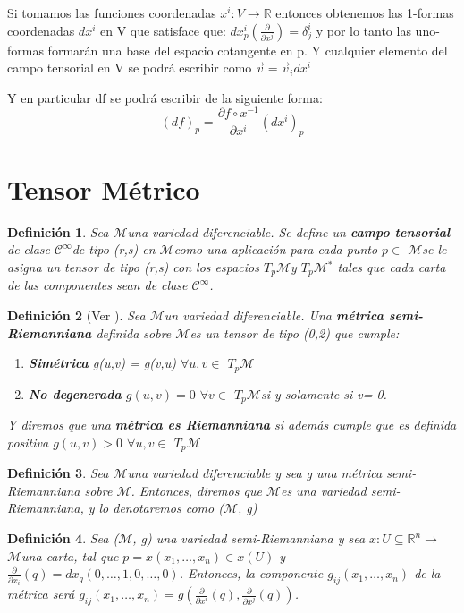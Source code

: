 \documentclass[pdftex,11pt,a4paper]{book}
\newtheorem{defi}{Definici\'on}
\newcommand{\M}{$\mathscr{M}$}
\newcommand{\Cinf}{ $\mathscr{C}^\infty$}
\newcommand{\tpm}{$T_p\mathscr{M}$}
\newcommand{\x}{(x_1, \ldots,x_n)}
\begin{document}
Si tomamos las funciones coordenadas $x^i:V \to \mathbb{R}$ entonces obtenemos las 1-formas coordenadas $dx^i$ en V que satisface que: 
$dx^i_p(\frac{\partial}{\partial x^j}) = \delta^i_j$ y por lo tanto 
las uno-formas formarán una base del espacio cotangente en p. Y cualquier elemento del campo tensorial en V se podrá escribir como $\vec{v}= \vec{v}_i dx^i $

Y en particular df se podrá escribir de la siguiente forma: 
\begin{equation*}
    (df)_p= \frac{\partial f\circ x^{-1}}{\partial x^i} (dx^i)_p
\end{equation*}


\section{Tensor Métrico}
\begin{defi}
Sea \M una variedad diferenciable. Se define un \textbf{campo tensorial} de clase \Cinf de tipo (r,s) en \M como una aplicación para cada punto $p \in$ \M se le asigna un tensor de tipo (r,s) con los espacios \tpm y \tpm$^*$ tales que cada carta de las componentes sean de clase \Cinf.  
\end{defi}
\begin{defi}[Ver \cite{DoCarmoRiemann}]
Sea \M un variedad diferenciable. Una \textbf{métrica semi-Riemanniana} definida sobre \M es un tensor de tipo (0,2) que cumple: 
\begin{enumerate}
    \item \textbf{Simétrica} g(u,v) = g(v,u) $\forall u, v \in$ \tpm
    \item \textbf{No degenerada} $g(u,v) = 0$  $\forall  v \in$ \tpm si y solamente si v= 0.
\end{enumerate}

 Y diremos que una \textbf{métrica es Riemanniana} si además cumple que es definida positiva $g(u,v) > 0$  $\forall  u,v \in$ \tpm
 \end{defi}
 
\begin{defi}\cite{DoCarmoRiemann}
Sea \M una variedad diferenciable y sea g una métrica semi-Riemanniana sobre \M. Entonces, diremos que \M es una variedad semi-Riemanniana, y lo denotaremos como (\M, g)
\end{defi}

\begin{defi}
Sea (\M, g) una variedad semi-Riemanniana y sea $x:U\subseteq \mathbb{R}^n \to$ \M una carta, tal que $p= x(x_1,\ldots,x_n) \in x(U)$ y $\frac{\partial}{\partial x_i}(q) = dx_q(0,\ldots,1,0,\ldots,0)$. Entonces, la componente $g_{ij}\x$ de la métrica será $g_{ij}\x=g(\frac{\partial}{\partial x^i}(q), \frac{\partial}{\partial x^j}(q)) $. \\
\end{defi}
\end{document}
